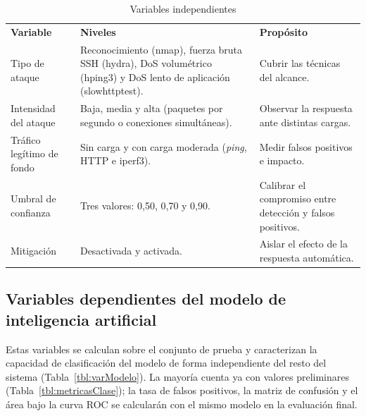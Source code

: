 \begin{table}[H]
\centering
\footnotesize
\renewcommand{\arraystretch}{1.2}
\caption{{\fontsize{11pt}{13}\selectfont Variables independientes}}
\label{tbl:varIndep}
\begin{tabular}{@{}L{3.6cm}L{7.4cm}L{4.5cm}@{}}
\textbf{Variable} & \textbf{Niveles} & \textbf{Propósito} \\
Tipo de ataque & Reconocimiento (nmap), fuerza bruta SSH (hydra), DoS volumétrico (hping3) y DoS lento de aplicación (slowhttptest). & Cubrir las técnicas del alcance. \\
Intensidad del ataque & Baja, media y alta (paquetes por segundo o conexiones simultáneas). & Observar la respuesta ante distintas cargas. \\
Tráfico legítimo de fondo & Sin carga y con carga moderada (\emph{ping}, HTTP e iperf3). & Medir falsos positivos e impacto. \\
Umbral de confianza & Tres valores: 0,50, 0,70 y 0,90. & Calibrar el compromiso entre detección y falsos positivos. \\
Mitigación & Desactivada y activada. & Aislar el efecto de la respuesta automática. \\
\end{tabular}
\end{table}

\subsection{Variables dependientes del modelo de inteligencia artificial}

Estas variables se calculan sobre el conjunto de prueba y caracterizan la capacidad de clasificación del modelo de forma independiente del resto del sistema (Tabla~\ref{tbl:varModelo}). La mayoría cuenta ya con valores preliminares (Tabla~\ref{tbl:metricasClase}); la tasa de falsos positivos, la matriz de confusión y el área bajo la curva ROC se calcularán con el mismo modelo en la evaluación final.

